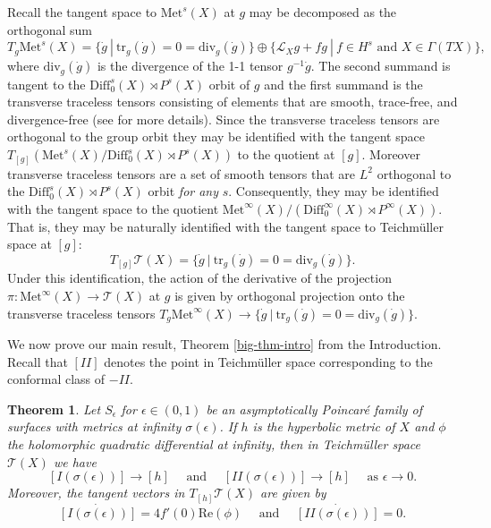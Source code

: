 \documentclass{amsart}
\newtheorem{thm}{Theorem}[section]
\newcommand{\two}{I\!\!I}
\begin{document}
Recall the tangent space to $\mathrm{Met}^s(X)$ at $g$ may be decomposed as the orthogonal sum
\[
T_g \mathrm{Met}^s(X) = \{\dot{g} \ | \ \mathrm{tr}_g (\dot{g}) = 0 = \mathrm{div}_g(\dot{g}) \} \oplus \{\mathcal{L}_X g + fg \ |\ f \in H^s \text{ and } X \in \Gamma(TX) \},
\] 
where $\mathrm{div}_g(\dot{g})$ is the divergence of the 1-1 tensor $g^{-1}\dot{g}$. 
The second summand is tangent to the $\mathrm{Diff}_0^s(X) \rtimes P^s(X)$ orbit of $g$ and the first summand is the transverse traceless tensors consisting of elements that are smooth, trace-free, and divergence-free (see \cite{fischer-marsden1975} for more details). 
Since the transverse traceless tensors are orthogonal to the group orbit they may be identified with the tangent space $T_{[g]} \left( \mathrm{Met}^s(X)/ \mathrm{Diff}_0^s(X) \rtimes P^s(X) \right)$ to the quotient at $[g]$. 
Moreover transverse traceless tensors are a set of smooth tensors that are $L^2$ orthogonal to the $\mathrm{Diff}_0^s(X) \rtimes P^s(X)$ orbit \textit{for any} $s$. 
Consequently, they may be identified with the tangent space to the quotient $\mathrm{Met}^\infty(X)/(\mathrm{Diff}_0^\infty(X) \rtimes P^\infty(X))$. 
That is, they may be naturally identified with the tangent space to Teichm\"uller space at $[g]$:
\[
T_{[g]} \mathcal{T}(X) = \{\dot{g} \ | \ \mathrm{tr}_g (\dot{g}) = 0 = \mathrm{div}_g(\dot{g}) \}.
\]
Under this identification, the action of the derivative of the projection $\pi: \mathrm{Met}^\infty(X) \to \mathcal{T}(X)$ at $g$ is given by orthogonal projection onto the transverse traceless tensors $T_g \mathrm{Met}^\infty(X) \to \{\dot{g} \ | \ \mathrm{tr}_g (\dot{g}) = 0 = \mathrm{div}_g(\dot{g}) \}$.

We now prove our main result, Theorem \ref{big-thm-intro} from the Introduction. 
Recall that $[\two]$ denotes the point in Teichm\"uller space corresponding to the conformal class of $-\two$.


\begin{thm}\label{main-result}
Let $S_\epsilon$ for $\epsilon \in (0,1)$ be an asymptotically Poincar\'e family of surfaces with metrics at infinity $\sigma(\epsilon)$. 
If $h$ is the hyperbolic metric of $X$ and $\phi$  the holomorphic quadratic differential at infinity, then in Teichm\"uller space $\mathcal{T}(X)$ we have 
\[
[I(\sigma(\epsilon))] \to [h]
\quad \text{ and } \quad
[\two(\sigma(\epsilon))] \to [h]
\quad \text{ as } \epsilon \to 0.
\]
Moreover, the tangent vectors in $T_{[h]} \mathcal{T}(X)$ are given by 
\[
\dot{[I(\sigma(\epsilon))]}  = 4 f'(0) \mathrm{Re}(\phi) \quad \text{ and } \quad \dot{[\two(\sigma(\epsilon))]} = 0.
\]
\end{thm}
\end{document}
